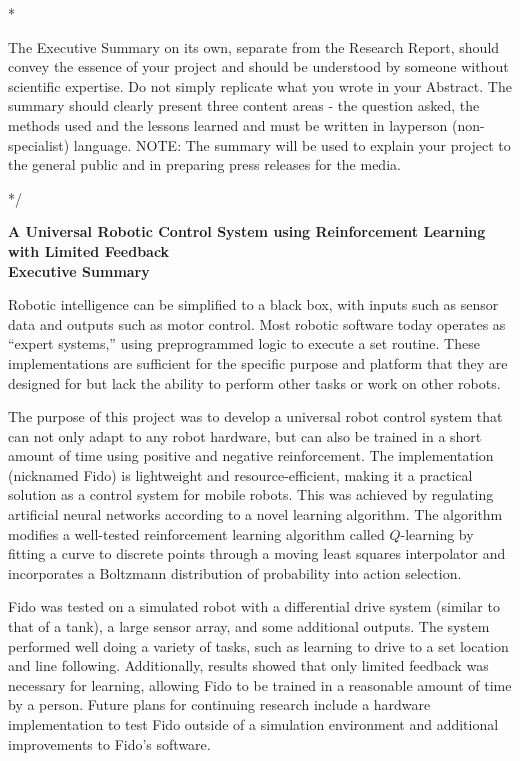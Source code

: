 \documentclass[letterpaper,12pt]{article}
\begin{document}
\/*

The Executive Summary on its own, separate from the Research Report, should convey the essence of your project and should be understood by someone without scientific expertise. Do not simply replicate what you wrote in your Abstract. The summary should clearly present three content areas - the question asked, the methods used and the lessons learned and must be written in layperson (non-specialist) language. NOTE: The summary will be used to explain your project to the general public and in preparing press releases for the media.

*/

\begin{center}
	{\Large
	\textbf{A Universal Robotic Control System using Reinforcement Learning with Limited Feedback}}\\
	\vspace{1cm}
	{\large \textbf{Executive Summary}}
\end{center}

\noindent

Robotic intelligence can be simplified to a black box, with inputs such as sensor data and outputs such as motor control.  Most robotic software today operates as ``expert systems,'' using preprogrammed logic to execute a set routine.  These implementations are sufficient for the specific purpose and platform that they are designed for but lack the ability to perform other tasks or work on other robots.

The purpose of this project was to develop a universal robot control system that can not only adapt to any robot hardware, but can also be trained in a short amount of time using positive and negative reinforcement.  The implementation (nicknamed Fido) is lightweight and resource-efficient, making it a practical solution as a control system for mobile robots.  This was achieved by regulating artificial neural networks according to a novel learning algorithm.  The algorithm modifies a well-tested reinforcement learning algorithm called $Q$-learning by fitting a curve to discrete points through a moving least squares interpolator and incorporates a Boltzmann distribution of probability into action selection.

Fido was tested on a simulated robot with a differential drive system (similar to that of a tank), a large sensor array, and some additional outputs.  The system performed well doing a variety of tasks, such as learning to drive to a set location and line following.  Additionally, results showed that only limited feedback was necessary for learning, allowing Fido to be trained in a reasonable amount of time by a person.  Future plans for continuing research include a hardware implementation to test Fido outside of a simulation environment and additional improvements to Fido's software.
\end{document}
